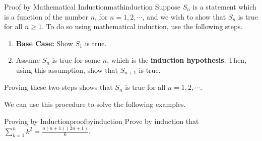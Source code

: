 \begin{procedure}{Proof by Mathematical Induction}{mathinduction}
Suppose $S_{n}$ is a statement which is a function of the number $n$, for $n=1,2,\cdots$, and
we wish to show that $S_{n}$ is true for all $n \geq 1$. To do so using mathematical induction, use the 
following steps.
\begin{enumerate}
\item \textbf{Base Case:} Show $S_{1}$ is true.

\item Assume $S_{n}$ is true for some $n$, which is the \textbf{induction hypothesis}. Then, using this assumption, 
show that $S_{n+1}$ is true. 
\end{enumerate}

Proving these two steps shows that $S_{n}$ is true for all $n = 1,2,\cdots$.
\end{procedure}

We can use this procedure to solve the following examples.

\begin{example}{Proving by Induction}{proofbyinduction}
Prove by induction that $\sum_{k=1}^{n}k^{2}=\displaystyle
\frac{n\left( n+1\right) \left( 2n+1\right) }{6}$.
\end{example}

